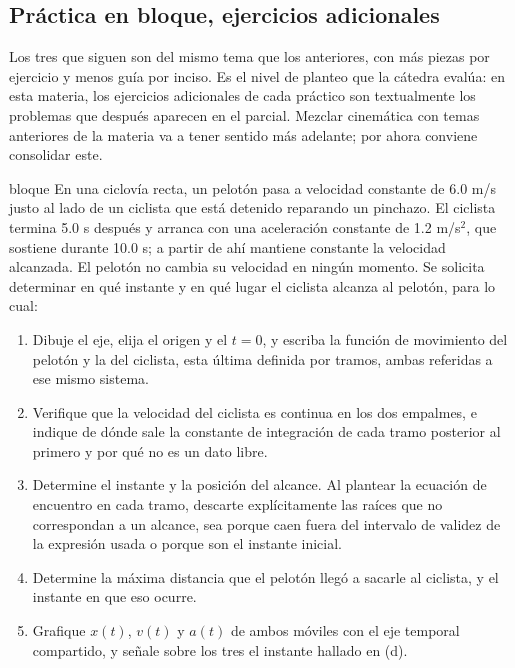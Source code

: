 \documentclass[11pt,openany]{book}
\begin{document}
\subsection{Práctica en bloque, ejercicios adicionales}

Los tres que siguen son del mismo tema que los anteriores, con más piezas por ejercicio y menos guía por inciso. Es el nivel de planteo que la cátedra evalúa: en esta materia, los ejercicios adicionales de cada práctico son textualmente los problemas que después aparecen en el parcial. Mezclar cinemática con temas anteriores de la materia va a tener sentido más adelante; por ahora conviene consolidar este.

\begin{ejercicio}{bloque}
En una ciclovía recta, un pelotón pasa a velocidad constante de 6.0 m/s justo al lado de un ciclista que está detenido reparando un pinchazo. El ciclista termina 5.0 s después y arranca con una aceleración constante de 1.2 m/s$^2$, que sostiene durante 10.0 s; a partir de ahí mantiene constante la velocidad alcanzada. El pelotón no cambia su velocidad en ningún momento. Se solicita determinar en qué instante y en qué lugar el ciclista alcanza al pelotón, para lo cual:
\begin{enumerate}[label=(\alph*), leftmargin=1.7em, itemsep=1pt, topsep=3pt]
  \item Dibuje el eje, elija el origen y el $t = 0$, y escriba la función de movimiento del pelotón y la del ciclista, esta última definida por tramos, ambas referidas a ese mismo sistema.
  \item Verifique que la velocidad del ciclista es continua en los dos empalmes, e indique de dónde sale la constante de integración de cada tramo posterior al primero y por qué no es un dato libre.
  \item Determine el instante y la posición del alcance. Al plantear la ecuación de encuentro en cada tramo, descarte explícitamente las raíces que no correspondan a un alcance, sea porque caen fuera del intervalo de validez de la expresión usada o porque son el instante inicial.
  \item Determine la máxima distancia que el pelotón llegó a sacarle al ciclista, y el instante en que eso ocurre.
  \item Grafique $x(t)$, $v(t)$ y $a(t)$ de ambos móviles con el eje temporal compartido, y señale sobre los tres el instante hallado en (d).
\end{enumerate}
\end{ejercicio}
\end{document}
